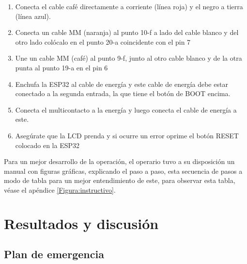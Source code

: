 \begin{enumerate}
        \item Conecta el cable café directamente a corriente (línea roja) y el negro a tierra (línea azul). 
    
        \item  Conecta un cable MM (naranja) al punto 10-f a lado del cable blanco y del otro lado colócalo en el punto 20-a coincidente con el pin 7
    
        \item Une un cable MM (café) al punto 9-f, junto al otro cable blanco y de la otra punta al punto 19-a en el pin 6 
    
        \item  Enchufa la ESP32 al cable de energía y este cable de energía debe estar conectado a la segunda entrada, la que tiene el botón de BOOT encima.
    
        \item Conecta el multicontacto a la energía y luego conecta el cable de energía a este.
    
    
        \item Asegúrate que la LCD prenda y si ocurre un error oprime el botón RESET colocado en la ESP32
    
    \end{enumerate}
    
    
    Para un mejor desarrollo de la operación, el operario tuvo a su disposición un manual con figuras gráficas, explicando el paso a paso, esta secuencia de pasos a modo de tabla para un mejor entendimiento de este, para observar esta tabla, véase el apéndice \ref{Figura:instructivo}.
    
    \section{Resultados y discusión}
    \subsection{Plan de emergencia}
    
    
